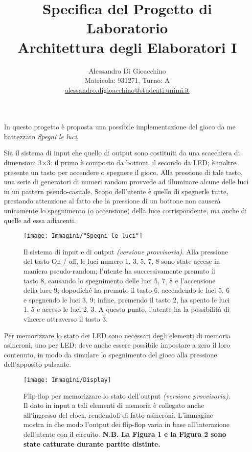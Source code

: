 \documentclass[11pt]{article}
\title{Specifica del Progetto di Laboratorio \\ Architettura degli Elaboratori I}
\author{Alessandro Di Gioacchino\\ Matricola: 931271, Turno: A\\ \url{alessandro.digioacchino@studenti.unimi.it}}
\date{}
\begin{document}
\maketitle

In questo progetto è proposta una possibile implementazione del gioco da me battezzato {\itshape Spegni le luci}. 

Sia il sistema di input che quello di output sono costituiti da una scacchiera di dimensioni 3$\times$3: il primo è composto da bottoni, il secondo da LED; è inoltre presente un tasto per accendere o spegnere il gioco. Alla pressione di tale tasto, una serie di generatori di numeri random provvede ad illuminare alcune delle luci in un pattern pseudo-casuale. Scopo dell'utente è quello di spegnerle tutte, prestando attenzione al fatto che la pressione di un bottone non causerà unicamente lo spegnimento (o accensione) della luce corrispondente, ma anche di quelle ad essa adiacenti.

\begin{figure}[!htpb]
\centering
\texttt{[image: Immagini/"Spegni le luci"]}
\caption{\footnotesize{Il sistema di input e di output {\itshape (versione provvisoria)}. Alla pressione del tasto On / off, le luci numero 1, 3, 5, 7, 8 sono state accese in maniera pseudo-random; l'utente ha successivamente premuto il tasto 8, causando lo spegnimento delle luci 5, 7, 8 e l'accensione della luce 9; dopodiché ha premuto il tasto 6, accendendo le luci 5, 6 e spegnendo le luci 3, 9; infine, premendo il tasto 2, ha spento le luci 1, 5 e acceso le luci 2, 3. A questo punto, l'utente ha la possibilità di vincere attraverso il tasto 3.}}
\label{fig:spegnileluci}
\end{figure}

Per memorizzare lo stato dei LED sono necessari degli elementi di memoria asincroni, uno per LED; deve anche essere possibile impostare a zero il loro contenuto, in modo da simulare lo spegnimento del gioco alla pressione dell'apposito pulsante.

\begin{figure}[!htpb]
\centering
\texttt{[image: Immagini/Display]}
\caption{\footnotesize{Flip-flop per memorizzare lo stato dell'output {\itshape (versione provvisoria)}. Il dato in input a tali elementi di memoria è collegato anche all'ingresso del clock, rendendoli di fatto asincroni. L'immagine mostra in che modo l'output dei flip-flop varia in base all'interazione dell'utente con il circuito.
\textbf {N.B. La Figura 1 e la Figura 2 sono state catturate durante partite distinte.}}}
\label{fig:display}
\end{figure}
\end{document}
